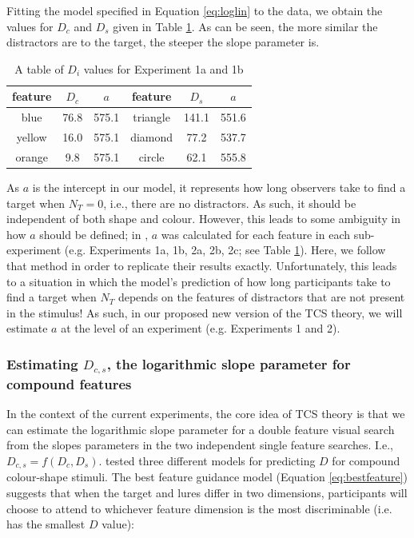 \documentclass[smallextended, natbib]{svjour3}       %
\begin{document}
Fitting the model specified in Equation \ref{eq:loglin} to the data, we obtain the values for $D_c$ and $D_s$ given in Table \ref{tab:reimp_Dc_Ds}. As can be seen, the more similar the distractors are to the target, the steeper the slope parameter is. 

\begin{table}[h]
\centering
\begin{tabular}{ ccc|ccc } 
feature & $D_c$ & $a$ & feature & $D_s$ & $a$\\
 \hline 
blue & 76.8 & 575.1 & triangle & 141.1 & 551.6\\
yellow & 16.0 & 575.1 & diamond & 77.2 & 537.7\\
orange & 9.8 & 575.1 & circle & 62.1& 555.8\\
\end{tabular}
\caption{A table of $D_i$ values for Experiment 1a and 1b}
\label{tab:reimp_Dc_Ds}
\end{table}

As $a$ is the intercept in our model, it represents how long observers take to find a target when $N_T = 0$, i.e., there are no distractors. As such, it should be independent of both shape and colour. However, this leads to some ambiguity in how $a$ should be defined; in \cite{buetti2019predicting}, $a$ was calculated for each feature in each sub-experiment (e.g. Experiments 1a, 1b, 2a, 2b, 2c; see Table \ref{tab:reimp_Dc_Ds}). Here, we follow that method in order to replicate their results exactly. Unfortunately, this leads to a situation in which the model's prediction of how long participants take to find a target when $N_T$ depends on the features of distractors that are not present in the stimulus! As such, in our proposed new version of the TCS theory, we will estimate $a$ at the level of an experiment (e.g. Experiments 1 and 2).

\subsubsection{Estimating $D_{c,s}$, the logarithmic slope parameter for compound features}

In the context of the current experiments, the core idea of TCS theory is that we can estimate the logarithmic slope parameter for a double feature visual search from the slopes parameters in the two independent single feature searches. I.e., $D_{c,s} = f(D_c, D_s)$. \cite{buetti2019predicting} tested three different models for predicting $D$ for compound colour-shape stimuli. The best feature guidance model (Equation \ref{eq:bestfeature}) suggests that when the target and lures differ in two dimensions, participants will choose to attend to whichever feature dimension is the most discriminable (i.e. has the smallest $D$ value):
\end{document}
